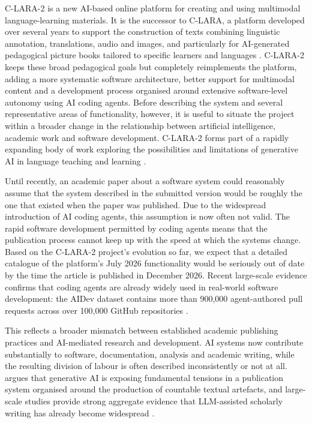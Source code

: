 \documentclass[11pt,a4paper]{article}
\begin{document}
C-LARA-2 is a new AI-based online platform for creating and using multimodal language-learning materials. It is the successor to C-LARA, a platform developed over several years to support the construction of texts combining linguistic annotation, translations, audio and images, and particularly for AI-generated pedagogical picture books tailored to specific learners and languages \citep{BediEtAl2025}. C-LARA-2 keeps these broad pedagogical goals but completely reimplements the platform, adding a more systematic software architecture, better support for multimodal content and a development process organised around extensive software-level autonomy using AI coding agents. Before describing the system and several representative areas of functionality, however, it is useful to situate the project within a broader change in the relationship between artificial intelligence, academic work and software development. C-LARA-2 forms part of a rapidly expanding body of work exploring the possibilities and limitations of generative AI in language teaching and learning \citep{Law2024}.

Until recently, an academic paper about a software system could reasonably assume that the system described in the submitted version would be roughly the one that existed when the paper was published. Due to the widespread introduction of AI coding agents, this assumption is now often not valid. The rapid software development permitted by coding agents means that the publication process cannot keep up with the speed at which the systems change. Based on the C-LARA-2 project's evolution so far, we expect that a detailed catalogue of the platform's July 2026 functionality would be seriously out of date by the time the article is published in December 2026. Recent large-scale evidence confirms that coding agents are already widely used in real-world software development: the AIDev dataset contains more than 900,000 agent-authored pull requests across over 100,000 GitHub repositories \citep{LiEtAl2026}.

This reflects a broader mismatch between established academic publishing practices and AI-mediated research and development. AI systems now contribute substantially to software, documentation, analysis and academic writing, while the resulting division of labour is often described inconsistently or not at all. \citet{Manabu2026} argues that generative AI is exposing fundamental tensions in a publication system organised around the production of countable textual artefacts, and large-scale studies provide strong aggregate evidence that LLM-assisted scholarly writing has already become widespread \citep{KobakEtAl2025}.
\end{document}
